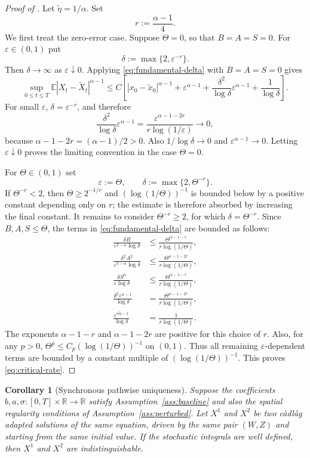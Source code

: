 \documentclass[11pt]{article}
\newtheorem{corollary}[theorem]{Corollary}
\newcommand{\R}{\mathbb{R}}
\newcommand{\E}{\mathbb{E}}
\newcommand{\1}{\mathbf{1}}
\newcommand{\wt}{\tilde}
\newcommand{\eps}{\varepsilon}
\begin{document}
\begin{proof}[Proof of ]
Let $\wt\eta=1/\alpha$. Set
\[
  r:=\frac{\alpha-1}{4}.
\]
We first treat the zero-error case. Suppose $\Theta=0$, so that $B=A=S=0$. For $\eps\in(0,1)$ put
\[
  \delta:=\max\{2,\eps^{-r}\}.
\]
Then $\delta\to\infty$ as $\eps\downarrow0$. Applying \eqref{eq:fundamental-delta} with $B=A=S=0$ gives
\[
\sup_{0\le t\le T}\E|X_t-\wt X_t|^{\alpha-1}
\le C\left[|x_0-\wt x_0|^{\alpha-1}+\eps^{\alpha-1}
+\frac{\delta^2}{\log\delta}\eps^{\alpha-1}
+\frac{1}{\log\delta}\right].
\]
For small $\eps$, $\delta=\eps^{-r}$, and therefore
\[
  \frac{\delta^2}{\log\delta}\eps^{\alpha-1}
  =\frac{\eps^{\alpha-1-2r}}{r\log(1/\eps)}\longrightarrow0,
\]
because $\alpha-1-2r=(\alpha-1)/2>0$. Also $1/\log\delta\to0$ and $\eps^{\alpha-1}\to0$. Letting $\eps\downarrow0$ proves the limiting convention in the case $\Theta=0$.

For $\Theta\in(0,1)$ set
\[
  \eps:=\Theta,
  \qquad
  \delta:=\max\{2,\Theta^{-r}\}.
\]
If $\Theta^{-r}<2$, then $\Theta\ge 2^{-1/r}$ and $(\log(1/\Theta))^{-1}$ is bounded below by a positive constant depending only on $r$; the estimate is therefore absorbed by increasing the final constant. It remains to consider $\Theta^{-r}\ge2$, for which $\delta=\Theta^{-r}$. Since $B,A,S\le\Theta$, the terms in \eqref{eq:fundamental-delta} are bounded as follows:
\begin{align*}
\frac{\delta B}{\eps^{2-\alpha}\log\delta}
&\le \frac{\Theta^{\alpha-1-r}}{r\log(1/\Theta)},\\
\frac{\delta^2 A^2}{\eps^{3-\alpha}\log\delta}
&\le \frac{\Theta^{\alpha-1-2r}}{r\log(1/\Theta)},\\
\frac{\delta S^\alpha}{\eps\log\delta}
&\le \frac{\Theta^{\alpha-1-r}}{r\log(1/\Theta)},\\
\frac{\delta^2\eps^{\alpha-1}}{\log\delta}
&=\frac{\Theta^{\alpha-1-2r}}{r\log(1/\Theta)},\\
\frac{\eps^{\alpha\wt\eta-1}}{\log\delta}
&=\frac{1}{r\log(1/\Theta)}.
\end{align*}
The exponents $\alpha-1-r$ and $\alpha-1-2r$ are positive for this choice of $r$. Also, for any $p>0$, $\Theta^p\le C_p(\log(1/\Theta))^{-1}$ on $(0,1)$. Thus all remaining $\eps$-dependent terms are bounded by a constant multiple of $(\log(1/\Theta))^{-1}$. This proves \eqref{eq:critical-rate}.
\end{proof}

\begin{corollary}[Synchronous pathwise uniqueness]\label{cor:pathwise-uniqueness}
Suppose the coefficients $b,a,\sigma:[0,T]\times\R\to\R$ satisfy Assumption~\ref{ass:baseline} and also the spatial regularity conditions of Assumption~\ref{ass:perturbed}. Let $X^1$ and $X^2$ be two c\`adl\`ag adapted solutions of the same equation, driven by the same pair $(W,Z)$ and starting from the same initial value. If the stochastic integrals are well defined, then $X^1$ and $X^2$ are indistinguishable.
\end{corollary}
\end{document}
